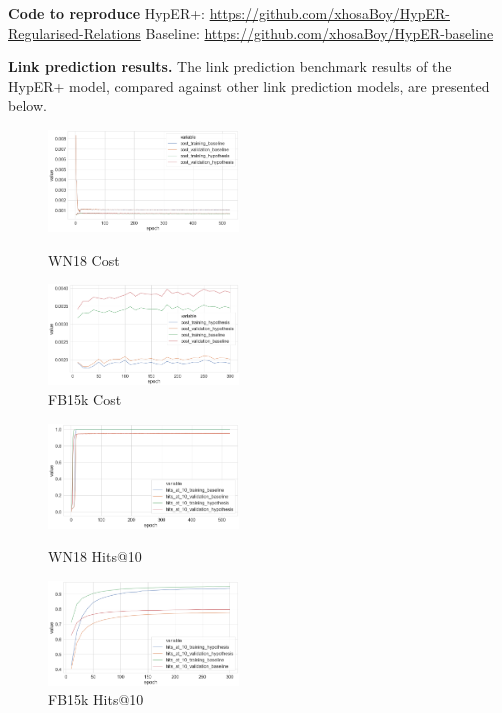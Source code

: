 \noindent \textbf{Code to reproduce} \newline
HypER+: \url{https://github.com/xhosaBoy/HypER-Regularised-Relations} \newline
Baseline: \url{https://github.com/xhosaBoy/HypER-baseline}

\noindent \textbf{Link prediction results.} The link prediction benchmark results of the HypER+ model, compared against other link prediction models, are presented below.


\bigskip

\begin{figure}[H]
	\parbox{.5\linewidth}{
   		\centering
    		\includegraphics[width=0.45\textwidth, height=0.2\textheight]{WN18_Cost_Results}
		\caption{WN18 Cost}
		}
	\hfill
	\parbox{.5\linewidth}{
   		\centering
		\includegraphics[width=0.45\textwidth, height=0.2\textheight]{FB15k_Cost_Results}
		\caption{FB15k Cost}
		}
\end{figure}



\begin{figure}[H]
	\parbox{.5\linewidth}{
   		\centering
    		\includegraphics[width=0.45\textwidth, height=0.2\textheight]{WN18_hits_at_10_Results}
		\caption{WN18 Hits@10}
		}
	\hfill
	\parbox{.5\linewidth}{
   		\centering
		\includegraphics[width=0.45\textwidth, height=0.2\textheight]{FB15k_hits_at_10_Results}
		\caption{FB15k Hits@10}
		}
\end{figure}

